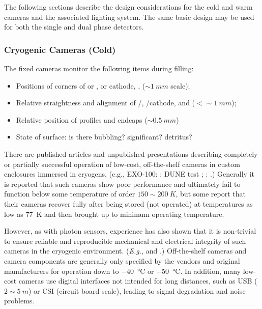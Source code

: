 The following sections describe the design considerations for the cold
and warm cameras and the associated lighting system.  The same basic
design may be used for both the single and dual phase detectors.



\subsubsection{Cryogenic Cameras (Cold)}

The fixed cameras %
monitor the following items during filling:
\begin{itemize}
\item Positions of corners of  or ,  or cathode, ,  (\(\sim\SI{1}{mm}\) scale);
\item Relative straightness and alignment of /, /cathode, and  (\(<\sim\SI{1}{mm}\));
\item Relative position of profiles and endcaps (\(\sim\SI{0.5}{mm}\))
\item State of \lar surface: is there bubbling? significant? detritus?
\end{itemize}

There are published articles and unpublished presentations describing
completely or partially successful operation of low-cost,
off-the-shelf  cameras in custom enclosures immersed in cryogens.
(e.g., EXO-100: \cite{Delaquis:2013hva}; DUNE  test
\cite{McConkey:2016spe}; : \cite{Murphy:20170516}.)  Generally
it is reported that such cameras show poor performance and ultimately
fail to function below some temperature of order \(150\sim\SI{200}{K}\), but some report that their cameras recover fully after
being stored (not operated) at temperatures as low as \SI{77}{K} and
then brought up to minimum operating temperature.

However, as with photon sensors, experience has also shown that it is
non-trivial to ensure reliable and reproducible mechanical and
electrical integrity of such cameras in the cryogenic environment.
({\em E.g.}, \cite{McConkey:2016spe} and
\cite{Valencia-Rodriquez:20180130}.)  Off-the-shelf cameras and camera
components are generally only specified by the vendors and original
manufacturers for operation down to \SI{-40}{\celsius} or \SI{-50}{\celsius}.
In addition, many low-cost cameras use digital interfaces not intended
for long distances, such as USB (\(2\sim\SI{5}{m}\)) or CSI (circuit
board scale), leading to signal degradation and noise problems.

